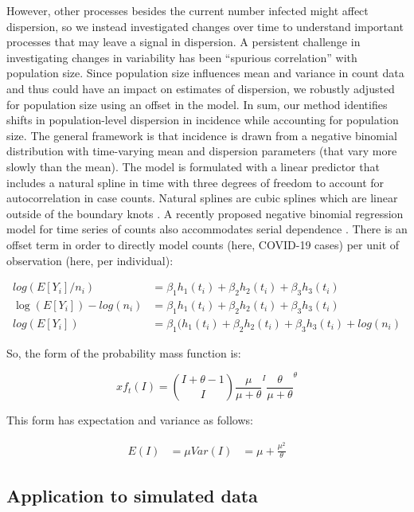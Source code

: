 \documentclass[10pt,letterpaper]{article}
\begin{document}
However, other processes besides the current number infected might affect dispersion, so we instead investigated changes over time to understand important processes that may leave a signal in dispersion. 
A persistent challenge in investigating changes in variability has been ``spurious correlation'' with population size. 
Since population size influences mean and variance in count data and thus could have an impact on estimates of dispersion, we robustly adjusted for population size using an offset in the model. 
In sum, our method identifies shifts in population-level dispersion in incidence while accounting for population size. 
The general framework is that incidence is drawn from a negative binomial distribution with time-varying mean and dispersion parameters (that vary more slowly than the mean). 
The model is formulated with a linear predictor that includes a natural spline in time with three degrees of freedom to account for autocorrelation in case counts. 
Natural splines are cubic splines which are linear outside of the boundary knots \cite{perperoglou_review_2019}. 
A recently proposed negative binomial regression model for time series of counts also accommodates serial dependence \cite{davis_negative_2009}. 
There is an offset term in order to directly model counts (here, COVID-19 cases) per unit of observation (here, per individual):

\begin{align}
  log(E[Y_i]/n_i) &= \beta_1h_1(t_i) + \beta_2h_2(t_i) + \beta_3h_3(t_i) \\
  \log(E[Y_i])-log(n_i) &= \beta_1h_1(t_i) + \beta_2h_2(t_i) + \beta_3h_3(t_i) \\ 
  log(E[Y_i]) &= \beta_1(h_1(t_i) + \beta_2h_2(t_i) + \beta_3h_3(t_i) + log(n_i) 
\end{align}

So, the form of the probability mass function is:

\begin{equation}
x  f_t(I) = \binom{I + \theta - 1}{I} \frac{\mu}{\mu+\theta}^I \frac{\theta}{\mu +\theta}^\theta
\end{equation}

This form has expectation and variance as follows:

\begin{align}
E(I) &= \mu
Var(I) &= \mu + \frac{\mu^2}{\theta}
\end{align}

\subsection*{Application to simulated data}
\end{document}
